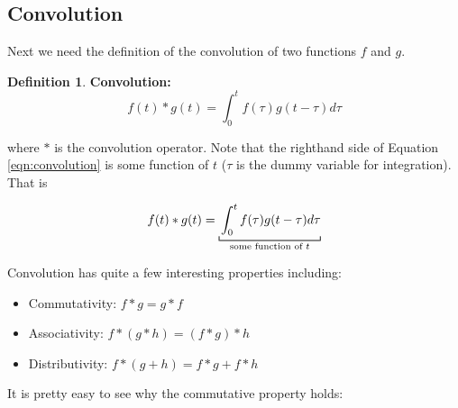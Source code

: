 \documentclass{article}
\theoremstyle{definition}
\newtheorem{definition}{Definition}[section]
\begin{document}
\bigskip
\subsection{Convolution}
\label{sec:convolution}
Next we need the definition of the convolution of two functions $f$ and $g$.

\bigskip
\begin{definition} {\bf Convolution:}
\bigskip
\begin{equation}
f(t) \ast g(t) = \int^t_0 f(\tau) g(t - \tau) d\tau
\label{eqn:convolution}
\end{equation}
\label{def:convolution}
\end{definition}

\noindent
where $\ast$ is the convolution operator. Note that the righthand side of Equation \ref{eqn:convolution} is some function of $t$ ($\tau$ is the dummy variable 
for integration). That is

\bigskip
\begin{equation*}
f(t) \ast g(t) = \underbracket [0.15 ex] {\strut \int^t_0 f(\tau) g(t - \tau) d\tau}_{\text{some function of } t}
\end{equation*}

\bigskip
\noindent
Convolution has quite a few interesting properties including:

\bigskip
 \begin{itemize}
 \item Commutativity: $f \ast g = g \ast f$ 
 \item Associativity: $f \ast (g \ast h) = (f \ast g) \ast h$
 \item Distributivity:  $f \ast (g + h) = f \ast g + f \ast h$
\end{itemize}

\bigskip
\noindent
It is pretty easy to see why the commutative property holds:
\end{document}
